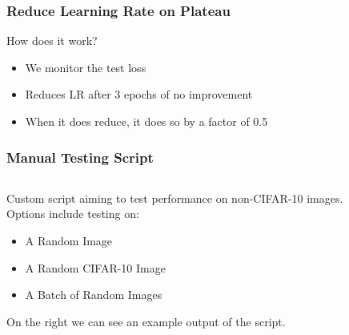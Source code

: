 \begin{frame}
\frametitle{Reduce Learning Rate on Plateau}
\center How does it work?
\begin{itemize}
    \item We monitor the test loss
    \item Reduces LR after 3 epochs of no improvement
    \item When it does reduce, it does so by a factor of 0.5
\end{itemize}
\end{frame}

\begin{frame}
\frametitle{Manual Testing Script}
\begin{columns}[t]
    \begin{column}{0.5\textwidth}    
        Custom script aiming to test performance on non-CIFAR-10 images.\\
        Options include testing on:
        \begin{itemize}
            \item A Random Image
            \item A Random CIFAR-10 Image
            \item A Batch of Random Images
        \end{itemize}
        On the right we can see an example output of the script.
    \end{column}


\end{columns}
\end{frame}

